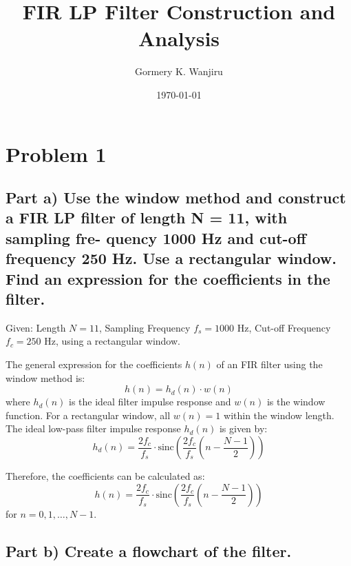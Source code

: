 \documentclass{article}
\begin{document}
\title{FIR LP Filter Construction and Analysis}
\author{Gormery K. Wanjiru}
\date{\today}
\maketitle

\section*{Problem 1}

\subsection*{Part a) Use the window method and construct a FIR LP filter of length N = 11, with sampling fre-
quency 1000 Hz and cut-off frequency 250 Hz. Use a rectangular window. Find an expression
for the coefficients in the filter.}

Given: Length \(N = 11\), Sampling Frequency \(f_s = 1000\) Hz, Cut-off Frequency \(f_c = 250\) Hz, using a rectangular window.

The general expression for the coefficients \(h(n)\) of an FIR filter using the window method is:
\[ h(n) = h_d(n) \cdot w(n) \]
where \(h_d(n)\) is the ideal filter impulse response and \(w(n)\) is the window function. For a rectangular window, all \(w(n) = 1\) within the window length. \\

The ideal low-pass filter impulse response \(h_d(n)\) is given by:
\[ h_d(n) = \frac{2f_c}{f_s} \cdot \text{sinc}\left(\frac{2f_c}{f_s}(n - \frac{N-1}{2})\right) \]

Therefore, the coefficients can be calculated as:
\[ h(n) = \frac{2f_c}{f_s} \cdot \text{sinc}\left(\frac{2f_c}{f_s}(n - \frac{N-1}{2})\right) \]
for \(n = 0, 1, \ldots, N-1\).

\subsection*{Part b) Create a flowchart of the filter.}
\end{document}
